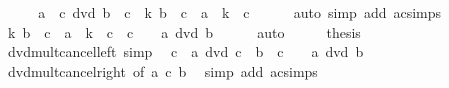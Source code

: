 \begin{isabellebody}
\isamarkupfalse%
\ {\isacharminus}{\kern0pt}\isanewline
\ \ \isamarkupfalse%
\ {\isachardoublequoteopen}a\ {\isacharasterisk}{\kern0pt}\ c\ dvd\ b\ {\isacharasterisk}{\kern0pt}\ c\ {\isasymlongleftrightarrow}\ {\isacharparenleft}{\kern0pt}{\isasymexists}k{\isachardot}{\kern0pt}\ b\ {\isacharasterisk}{\kern0pt}\ c\ {\isacharequal}{\kern0pt}\ {\isacharparenleft}{\kern0pt}a\ {\isacharasterisk}{\kern0pt}\ k{\isacharparenright}{\kern0pt}\ {\isacharasterisk}{\kern0pt}\ c{\isacharparenright}{\kern0pt}{\isachardoublequoteclose}\isanewline
\ \ \ \ \isamarkupfalse%
\ {\isacharparenleft}{\kern0pt}auto\ simp\ add{\isacharcolon}{\kern0pt}\ ac{\isacharunderscore}{\kern0pt}simps{\isacharparenright}{\kern0pt}\isanewline
\ \ \isamarkupfalse%
\ \isamarkupfalse%
\ {\isachardoublequoteopen}{\isacharparenleft}{\kern0pt}{\isasymexists}k{\isachardot}{\kern0pt}\ b\ {\isacharasterisk}{\kern0pt}\ c\ {\isacharequal}{\kern0pt}\ {\isacharparenleft}{\kern0pt}a\ {\isacharasterisk}{\kern0pt}\ k{\isacharparenright}{\kern0pt}\ {\isacharasterisk}{\kern0pt}\ c{\isacharparenright}{\kern0pt}\ {\isasymlongleftrightarrow}\ c\ {\isacharequal}{\kern0pt}\ {}\ {\isasymor}\ a\ dvd\ b{\isachardoublequoteclose}\isanewline
\ \ \ \ \isamarkupfalse%
\ auto\isanewline
\ \ \isamarkupfalse%
\ \isamarkupfalse%
\ {\isacharquery}{\kern0pt}thesis\ \isacommand{{\isachardot}{\kern0pt}}\isamarkupfalse%
\isanewline
{}\isamarkupfalse%
%
\endisatagproof
{\isafoldproof}%
%
\isadelimproof
\isanewline
%
\endisadelimproof
\isanewline
{}\isamarkupfalse%
\ dvd{\isacharunderscore}{\kern0pt}mult{\isacharunderscore}{\kern0pt}cancel{\isacharunderscore}{\kern0pt}left\ {\isacharbrackleft}{\kern0pt}simp{\isacharbrackright}{\kern0pt}{\isacharcolon}{\kern0pt}\isanewline
\ \ {\isachardoublequoteopen}c\ {\isacharasterisk}{\kern0pt}\ a\ dvd\ c\ {\isacharasterisk}{\kern0pt}\ b\ {\isasymlongleftrightarrow}\ c\ {\isacharequal}{\kern0pt}\ {}\ {\isasymor}\ a\ dvd\ b{\isachardoublequoteclose}\isanewline
%
\isadelimproof
\ \ %
\endisadelimproof
%
\isatagproof
{}\isamarkupfalse%
\ dvd{\isacharunderscore}{\kern0pt}mult{\isacharunderscore}{\kern0pt}cancel{\isacharunderscore}{\kern0pt}right\ {\isacharbrackleft}{\kern0pt}of\ a\ c\ b{\isacharbrackright}{\kern0pt}\ \isamarkupfalse%
\ {\isacharparenleft}{\kern0pt}simp\ add{\isacharcolon}{\kern0pt}\ ac{\isacharunderscore}{\kern0pt}simps{\isacharparenright}{\kern0pt}%
\endisatagproof

\end{isabellebody}
